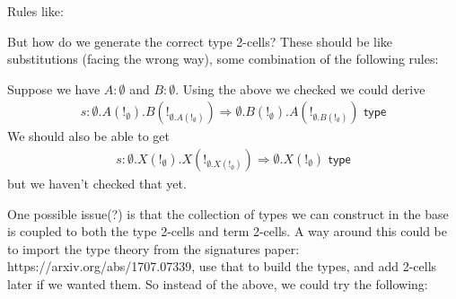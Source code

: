 \documentclass[10pt]{article}
\newcommand{\type}{\,\,\mathsf{type}}
\newcommand\just[1]{\ensuremath{\textsf{just}_{#1}}}
\begin{document}
Rules like:
But how do we generate the correct type 2-cells? These should be like substitutions (facing the wrong way), some combination of the following rules:

Suppose we have $A : \emptyset$ and $B : \emptyset$. Using the above we checked we could derive
\begin{align*}
s : \emptyset.A(!_\emptyset).B(!_{\emptyset.A(!_\emptyset)}) \Rightarrow \emptyset.B(!_\emptyset).A(!_{\emptyset.B(!_\emptyset)}) \type
\end{align*}
We should also be able to get
\begin{align*}
s : \emptyset.X(!_\emptyset).X(!_{\emptyset.X(!_\emptyset)}) \Rightarrow \emptyset.X(!_\emptyset) \type
\end{align*}
but we haven't checked that yet.


\newcommand{\subst}{\,\,\mathsf{subst}}
\newcommand{\varlist}{\,\,\mathsf{varlist}}

One possible issue(?) is that the collection of types we can construct in the base is coupled to both the type 2-cells and term 2-cells. A way around this could be to import the type theory from the signatures paper: https://arxiv.org/abs/1707.07339, use that to build the types, and add 2-cells later if we wanted them. So instead of the above, we could try the following:
\end{document}

